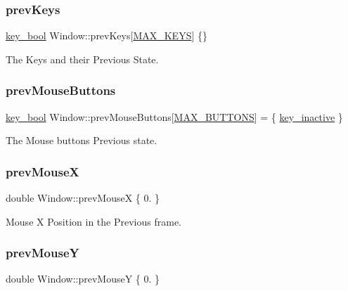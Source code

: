 \subsubsection{\texorpdfstring{prev\+Keys}{prevKeys}}
{\footnotesize\ttfamily \mbox{\hyperlink{_window_8h_a793ae82d7efec9490f81b4595e03b6f2}{key\+\_\+bool}} Window\+::prev\+Keys\mbox{[}\mbox{\hyperlink{_window_8h_a3077ecca3770bdee50e6a17dfb55d002}{M\+A\+X\+\_\+\+K\+E\+YS}}\mbox{]} \{\}}



The Keys and their Previous State. 

\mbox{\label{class_window_a89e8b6c9ffa84a095ec76cf1b29b5f94}} 
\subsubsection{\texorpdfstring{prev\+Mouse\+Buttons}{prevMouseButtons}}
{\footnotesize\ttfamily \mbox{\hyperlink{_window_8h_a793ae82d7efec9490f81b4595e03b6f2}{key\+\_\+bool}} Window\+::prev\+Mouse\+Buttons\mbox{[}\mbox{\hyperlink{_window_8h_a8bb0c7f312bb8665c3377a061dae552c}{M\+A\+X\+\_\+\+B\+U\+T\+T\+O\+NS}}\mbox{]} = \{ \mbox{\hyperlink{_window_8h_a793ae82d7efec9490f81b4595e03b6f2ab04ef1a66cda34ead7b763a49080d854}{key\+\_\+inactive}} \}}



The Mouse buttons Previous state. 

\mbox{\label{class_window_ad50401a5c3c350b562b9577106e60fb0}} 
\subsubsection{\texorpdfstring{prev\+MouseX}{prevMouseX}}
{\footnotesize\ttfamily double Window\+::prev\+MouseX \{ 0. \}}



Mouse X Position in the Previous frame. 

\mbox{\label{class_window_af4a58a8da45b8aeeb36dbcae237bcef4}} 
\subsubsection{\texorpdfstring{prev\+MouseY}{prevMouseY}}
{\footnotesize\ttfamily double Window\+::prev\+MouseY \{ 0. \}}



